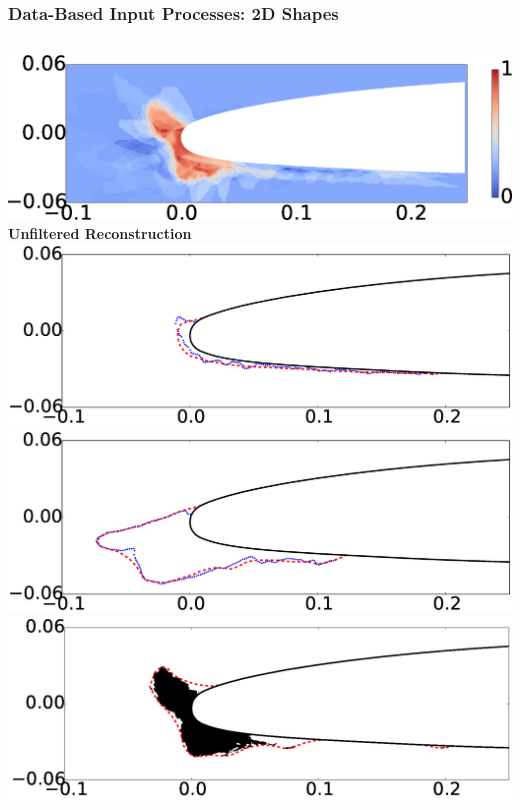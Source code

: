 \documentclass[9pt]{beamer}
\begin{document}
\begin{frame}
\frametitle{Data-Based Input Processes: 2D Shapes}
\label{sec-3-7}


\begin{columns}[c]
    \centering
    \hspace{-0.5em}
    \includegraphics[width=1\textwidth]{UnfilteredReconstruction.png} \\
    {\bf Unfiltered Reconstruction} \\
    \includegraphics[width=1\textwidth]{ReconstructionE1} \\
    \includegraphics[width=1\textwidth]{ReconstructionE9} \\
    \centering
    \includegraphics[width=1\textwidth]{FilteredReconstruction.png} \\

\end{columns}
\end{frame}
\end{document}
